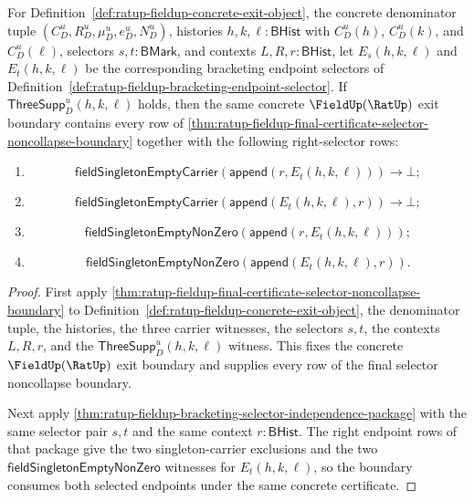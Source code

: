 \begin{theorem}
\label{thm:ratup-fieldup-final-certificate-two-selector-noncollapse-boundary}
For Definition~\ref{def:ratup-fieldup-concrete-exit-object}, the concrete
denominator tuple $(C_D^u,R_D^u,\mu_D^u,e_D^u,N_D^u)$, histories
$h,k,\ell:\mathsf{BHist}$ with $C_D^u(h)$, $C_D^u(k)$, and $C_D^u(\ell)$,
selectors $s,t:\mathsf{BMark}$, and contexts $L,R,r:\mathsf{BHist}$, let
$E_s(h,k,\ell)$ and $E_t(h,k,\ell)$ be the corresponding bracketing endpoint
selectors of Definition~\ref{def:ratup-fieldup-bracketing-endpoint-selector}. If
$\mathsf{ThreeSupp}_D^u(h,k,\ell)$ holds, then the same concrete
$\FieldUp(\RatUp)$ exit boundary contains every row of
\autoref{thm:ratup-fieldup-final-certificate-selector-noncollapse-boundary}
together with the following right-selector rows:
\begin{enumerate}
  \item
  $$
  \mathsf{fieldSingletonEmptyCarrier}(\mathsf{append}(r,E_t(h,k,\ell)))\to\bot;
  $$
  \item
  $$
  \mathsf{fieldSingletonEmptyCarrier}(\mathsf{append}(E_t(h,k,\ell),r))\to\bot;
  $$
  \item
  $$
  \mathsf{fieldSingletonEmptyNonZero}(\mathsf{append}(r,E_t(h,k,\ell)));
  $$
  \item
  $$
  \mathsf{fieldSingletonEmptyNonZero}(\mathsf{append}(E_t(h,k,\ell),r)).
  $$
\end{enumerate}
\end{theorem}
\begin{proof}
First apply
\autoref{thm:ratup-fieldup-final-certificate-selector-noncollapse-boundary} to
Definition~\ref{def:ratup-fieldup-concrete-exit-object}, the denominator tuple,
the histories, the three carrier witnesses, the selectors $s,t$, the contexts
$L,R,r$, and the $\mathsf{ThreeSupp}_D^u(h,k,\ell)$ witness. This fixes the
concrete $\FieldUp(\RatUp)$ exit boundary and supplies every row of the
final selector noncollapse boundary.

Next apply \autoref{thm:ratup-fieldup-bracketing-selector-independence-package}
with the same selector pair $s,t$ and the same context $r:\mathsf{BHist}$. The
right endpoint rows of that package give the two singleton-carrier exclusions
and the two $\mathsf{fieldSingletonEmptyNonZero}$ witnesses for
$E_t(h,k,\ell)$, so the boundary consumes both selected endpoints under the same
concrete certificate.
\end{proof}

